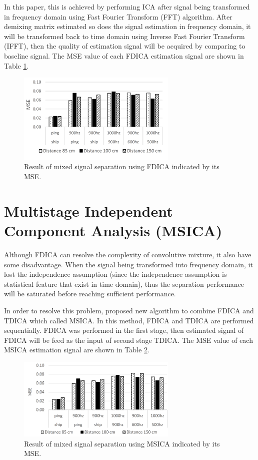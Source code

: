 \documentclass[a4paper]{jpconf}
\begin{document}
In this paper, this is achieved by performing ICA after signal being transformed in frequency domain using Fast Fourier Transform (FFT) algorithm. After demixing matrix estimated so does the signal estimation in frequency domain, it will be transformed back to time domain using Inverse Fast Fourier Transform (IFFT), then the quality of estimation signal will be acquired by comparing to baseline signal. The MSE value of each FDICA estimation signal are shown in Table \ref{pict:msefdica}.

\begin{figure}[h]
\begin{center}
\includegraphics[width=3in]{figure3.png}
\caption{\label{pict:msefdica}Result of mixed signal separation using FDICA indicated by its MSE.}
\end{center}
\end{figure}

\section{Multistage Independent Component Analysis (MSICA)}
Although FDICA can resolve the complexity of convolutive mixture, it also have some disadvantage. When the signal being transformed into frequency domain, it lost the independence assumption (since the independence assumption is statistical feature that exist in time domain), thus the separation performance will be saturated before reaching sufficient performance. 

In order to resolve this problem, \cite{2} proposed new algorithm to combine FDICA and TDICA which called MSICA. In this method, FDICA and TDICA are performed sequentially. FDICA was performed in the first stage, then estimated signal of FDICA will be feed as the input of second stage TDICA. The MSE value of each MSICA estimation signal are shown in Table \ref{pict:msemsica}.

\begin{figure}[h]
\begin{center}
\includegraphics[width=3in]{figure5.png}
\caption{\label{pict:msemsica}Result of mixed signal separation using MSICA indicated by its MSE.}
\end{center}
\end{figure}
\end{document}
